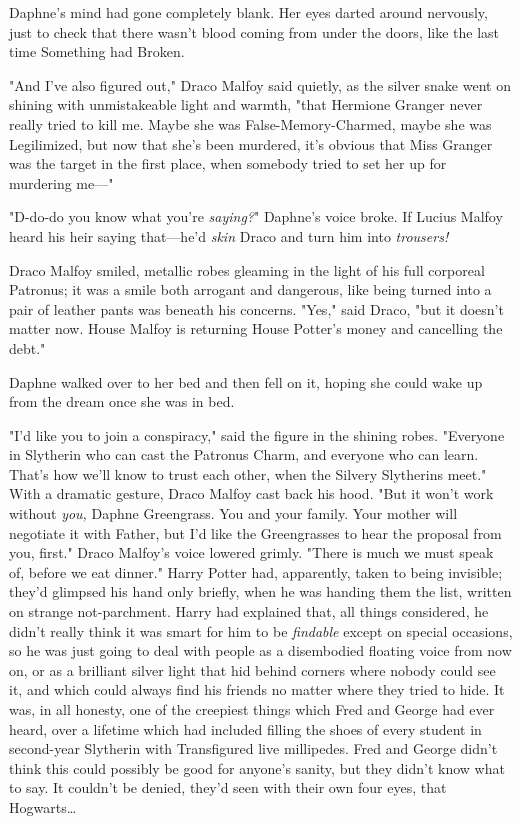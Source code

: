 Daphne's mind had gone completely blank. Her eyes darted around nervously, just
to check that there wasn't blood coming from under the doors, like the last
time Something had Broken.

"And I've also figured out," Draco Malfoy said quietly, as the silver snake
went on shining with unmistakeable light and warmth, "that Hermione Granger
never really tried to kill me. Maybe she was False-Memory-Charmed, maybe she
was Legilimized, but now that she's been murdered, it's obvious that Miss
Granger was the target in the first place, when somebody tried to set her up
for murdering me---"

"D-do-do you know what you're \emph{saying?}" Daphne's voice broke. If Lucius
Malfoy heard his heir saying that---he'd \emph{skin} Draco and turn him into
\emph{trousers!}

Draco Malfoy smiled, metallic robes gleaming in the light of his full corporeal
Patronus; it was a smile both arrogant and dangerous, like being turned into a
pair of leather pants was beneath his concerns. "Yes," said Draco, "but it
doesn't matter now. House Malfoy is returning House Potter's money and
cancelling the debt."

Daphne walked over to her bed and then fell on it, hoping she could wake up
from the dream once she was in bed.

"I'd like you to join a conspiracy," said the figure in the shining robes.
"Everyone in Slytherin who can cast the Patronus Charm, and everyone who can
learn. That's how we'll know to trust each other, when the Silvery Slytherins
meet." With a dramatic gesture, Draco Malfoy cast back his hood. "But it won't
work without \emph{you,} Daphne Greengrass. You and your family. Your mother
will negotiate it with Father, but I'd like the Greengrasses to hear the
proposal from you, first." Draco Malfoy's voice lowered grimly. "There is much
we must speak of, before we eat dinner."
\sbreak
Harry Potter had, apparently, taken to being invisible; they'd glimpsed his
hand only briefly, when he was handing them the list, written on strange
not-parchment. Harry had explained that, all things considered, he didn't
really think it was smart for him to be \emph{findable} except on special
occasions, so he was just going to deal with people as a disembodied floating
voice from now on, or as a brilliant silver light that hid behind corners where
nobody could see it, and which could always find his friends no matter where
they tried to hide. It was, in all honesty, one of the creepiest things which
Fred and George had ever heard, over a lifetime which had included filling the
shoes of every student in second-year Slytherin with Transfigured live
millipedes. Fred and George didn't think this could possibly be good for
anyone's sanity, but they didn't know what to say. It couldn't be denied,
they'd seen with their own four eyes, that Hogwarts{\ldots}

